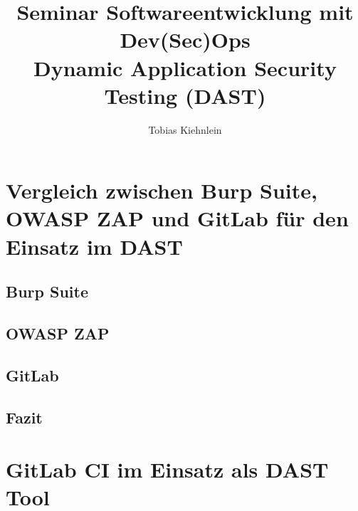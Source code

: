 \documentclass[
    paper=a4, %
    fontsize=12pt,  %
    oneside,        %
    headsepline,    %
    notitlepage     %
]{extarticle}         %
\author{Tobias Kiehnlein}
\title{\textbf{Seminar Softwareentwicklung mit Dev(Sec)Ops}\\\large{Dynamic Application Security Testing (DAST)}}
\date{}
\begin{document}
    \pagestyle{empty}
    \maketitle
    \tableofcontents
    \newpage
    \pagestyle{headings}

    
    
    

    \section{Vergleich zwischen Burp Suite, OWASP ZAP und GitLab für den Einsatz im DAST}\label{sec:vergleich-zwischen-burp-suite-owasp-zap-und-gitlab-für-den-einsatz-im-dast}
    \subsection{Burp Suite}
    \subsection{OWASP ZAP}
    \subsection{GitLab}
    \subsection{Fazit}

    \section{GitLab CI im Einsatz als DAST Tool}

    \newpage
    \printbibliography[heading=bibintoc]
    \newpage
    \listoffigures
\end{document}
